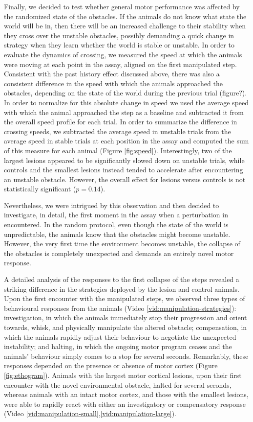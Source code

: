 Finally, we decided to test whether general motor performance was affected by the randomized state of the obstacles. If the animals do not know what state the world will be in, then there will be an increased challenge to their stability when they cross over the unstable obstacles, possibly demanding a quick change in strategy when they learn whether the world is stable or unstable. In order to evaluate the dynamics of crossing, we measured the speed at which the animals were moving at each point in the assay, aligned on the first manipulated step. Consistent with the past history effect discussed above, there was also a consistent difference in the speed with which the animals approached the obstacles, depending on the state of the world during the previous trial (figure?). In order to normalize for this absolute change in speed we used the average speed with which the animal approached the step as a baseline and subtracted it from the overall speed profile for each trial. In order to summarize the difference in crossing speeds, we subtracted the average speed in unstable trials from the average speed in stable trials at each position in the assay and computed the sum of this measure for each animal (Figure \ref{fig:speed}). Interestingly, two of the largest lesions appeared to be significantly slowed down on unstable trials, while controls and the smallest lesions instead tended to accelerate after encountering an unstable obstacle. However, the overall effect for lesions versus controls is not statistically significant ($p = 0.14$).

Nevertheless, we were intrigued by this observation and then decided to investigate, in detail, the first moment in the assay when a perturbation in encountered. In the random protocol, even though the state of the world is unpredictable, the animals know that the obstacles might become unstable. However, the very first time the environment becomes unstable, the collapse of the obstacles is completely unexpected and demands an entirely novel motor response.

A detailed analysis of the responses to the first collapse of the steps revealed a striking difference in the strategies deployed by the lesion and control animals. Upon the first encounter with the manipulated steps, we observed three types of behavioural responses from the animals (Video \ref{vid:manipulation-strategies}): investigation, in which the animals immediately stop their progression and orient towards, whisk, and physically manipulate the altered obstacle; compensation, in which the animals rapidly adjust their behaviour to negotiate the unexpected instability; and halting, in which the ongoing motor program ceases and the animals' behaviour simply comes to a stop for several seconds. Remarkably, these responses depended on the presence or absence of motor cortex (Figure \ref{fig:ethogram}). Animals with the largest motor cortical lesions, upon their first encounter with the novel environmental obstacle, halted for several seconds, whereas animals with an intact motor cortex, and those with the smallest lesions, were able to rapidly react with either an investigatory or compensatory response (Video \ref{vid:manipulation-small},\ref{vid:manipulation-large}).

